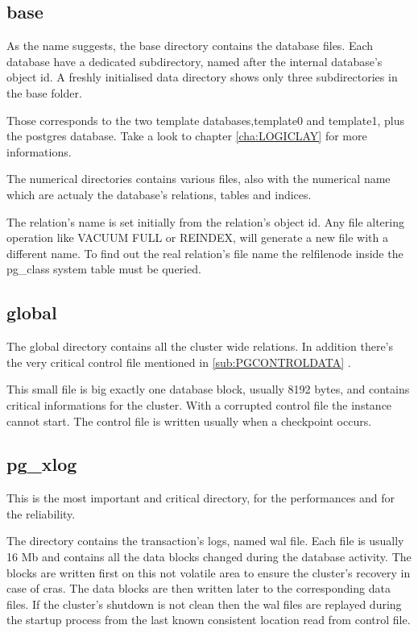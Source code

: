 \subsection{base}
\label{sub:BASE}
As the name suggests, the base directory contains the database files. Each 
database have a dedicated subdirectory, named after the internal database's 
object id.
A freshly initialised data directory shows only three 
subdirectories in the base folder.

Those corresponds to the two template databases,template0 and template1, plus 
the postgres database. Take a look to chapter \ref{cha:LOGICLAY} for more 
informations.

The numerical directories contains various files, also with the numerical name 
which are actualy the database's relations, tables and indices. 

The relation's name is set initially from the relation's object id. Any file 
altering operation like VACUUM FULL or REINDEX, will generate a new file 
with a different name. To find out the real relation's file name the 
relfilenode inside the pg\_class system table  must be queried.

\subsection{global}
The global directory contains all the cluster wide relations.
In addition there's the very critical  control file mentioned in 
\ref{sub:PGCONTROLDATA} .

This small file is big exactly one database block, usually 8192 bytes, and 
contains critical informations for the cluster. 
With a corrupted control file the instance cannot start. 
The control file is written usually when a checkpoint occurs.

\subsection{pg\_xlog}
This is the most important and critical directory, for the performances and for 
the reliability. 

The directory contains the transaction's logs,  named wal 
file. Each file is usually 16 Mb and contains all the data blocks changed during 
the database activity. 
The blocks are written first on this not volatile area to ensure the cluster's 
recovery in case of cras. The data blocks are then written later to the 
corresponding data files. If the cluster's shutdown is not clean then the wal 
files are replayed during the startup process from the last known consistent 
location read from control file.

